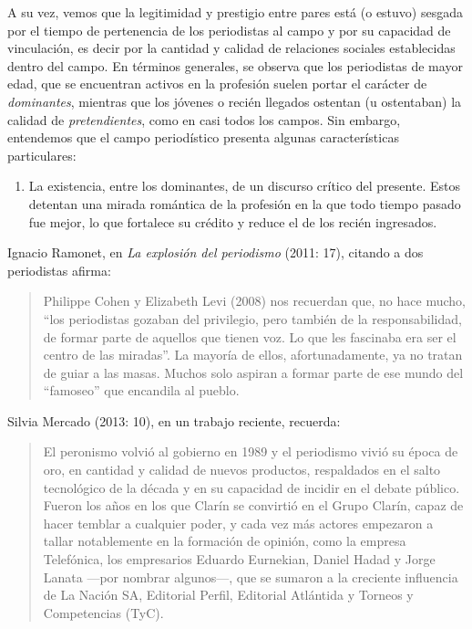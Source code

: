 A su vez, vemos que la legitimidad y prestigio entre pares está (o estuvo) sesgada por el tiempo de pertenencia de los periodistas al campo y por su capacidad de vinculación, es decir por la cantidad y calidad de relaciones sociales establecidas dentro del campo. En términos generales, se observa que los periodistas de mayor edad, que se encuentran activos en la profesión suelen portar el carácter de \emph{dominantes}, mientras que los jóvenes o recién llegados ostentan (u ostentaban) la calidad de \emph{pretendientes}, como en casi todos los campos. Sin embargo, entendemos que el campo periodístico presenta algunas características particulares:

\begin{enumerate}
\def\labelenumi{\alph{enumi})}
\item
  La existencia, entre los dominantes, de un discurso crítico del presente. Estos detentan una mirada romántica de la profesión en la que todo tiempo pasado fue mejor, lo que fortalece su crédito y reduce el de los recién ingresados.
\end{enumerate}

Ignacio Ramonet, en \emph{La explosión del periodismo} (2011: 17), citando a dos periodistas afirma:

\begin{quote}
Philippe Cohen y Elizabeth Levi (2008) nos recuerdan que, no hace mucho, \enquote{los periodistas gozaban del privilegio, pero también de la responsabilidad, de formar parte de aquellos que tienen voz. Lo que les fascinaba era ser el centro de las miradas}. La mayoría de ellos, afortunadamente, ya no tratan de guiar a las masas. Muchos solo aspiran a formar parte de ese mundo del \enquote{famoseo} que encandila al pueblo.
\end{quote}

Silvia Mercado (2013: 10), en un trabajo reciente, recuerda:

\begin{quote}
El peronismo volvió al gobierno en 1989 y el periodismo vivió su época de oro, en cantidad y calidad de nuevos productos, respaldados en el salto tecnológico de la década y en su capacidad de incidir en el debate público. Fueron los años en los que Clarín se convirtió en el Grupo Clarín, capaz de hacer temblar a cualquier poder, y cada vez más actores empezaron a tallar notablemente en la formación de opinión, como la empresa Telefónica, los empresarios Eduardo Eurnekian, Daniel Hadad y Jorge Lanata ---por nombrar algunos---, que se sumaron a la creciente influencia de La Nación SA, Editorial Perfil, Editorial Atlántida y Torneos y Competencias (TyC).
\end{quote}

